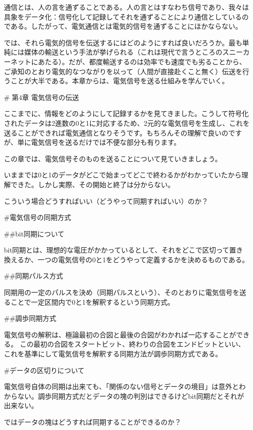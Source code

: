 通信とは、人の言を通ずることである。人の言とはすなわち信号であり、我々は具象をデータ化：信号化して記録してそれを通ずることにより通信としているのである。したがって、電気通信とは電気的信号を通ずることにほかならない。

では、それら電気的信号を伝送するにはどのようにすれば良いだろうか。最も単純には媒体の輸送という手法が挙げられる（これは現代で言うところのスニーカーネットにあたる）。だが、都度輸送するのは効率でも速度でも劣ることから、ご承知のとおり電気的なつながりを以って（人間が直接赴くこと無く）伝送を行うことが大半である。本章からは、電気信号を送る仕組みを学んでいく。

# 第4章 電気信号の伝送

ここまでに、情報をどのようにして記録するかを見てきました。こうして符号化されたデータは2進数の0と1に対応するため、2元的な電気信号を生成し、これを送ることができれば電気通信となりそうです。もちろんその理解で良いのですが、単に電気信号を送るだけでは不便な部分も有ります。

この章では、電気信号そのものを送ることについて見ていきましょう。

いままでは0と1のデータがどこで始まってどこで終わるかがわかっていたから理解できた。しかし実際、その開始と終了は分からない。

こういう場合どうすればいい（どうやって同期すればいい）のか？

#電気信号の同期方式

##bit同期について

bit同期とは、理想的な電圧がかかっているとして、それをどこで区切って置き換えるか、一つの電気信号の0と1をどうやって定義するかを決めるものである。

##同期パルス方式

同期用の一定のパルスを決め（同期パルスという）、そのとおりに電気信号を送ることで一定区間内で0と1を解釈するという同期方式。

##調歩同期方式

電気信号の解釈は、極論最初の合図と最後の合図がわかれば一応することができる。
この最初の合図をスタートビット、終わりの合図をエンドビットといい、これを基準にして電気信号を解釈する同期方法が調歩同期方式である。

#データの区切りについて

電気信号自体の同期は出来ても、「関係のない信号とデータの境目」は意外とわからない。調歩同期方式だとデータの塊の判別はできるけどbit同期だとそれが出来ない。

ではデータの塊はどうすれば同期することができるのか？

